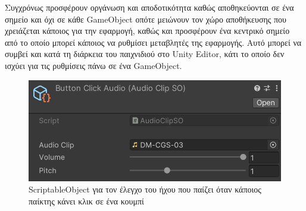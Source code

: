 Συγχρόνως προσφέρουν οργάνωση και αποδοτικότητα καθώς αποθηκεύονται σε ένα σημείο και όχι σε κάθε GameObject οπότε μειώνουν τον χώρο αποθήκευσης που χρειάζεται κάποιος για την εφαρμογή, καθώς και προσφέρουν ένα κεντρικό σημείο από το οποίο μπορεί κάποιος να ρυθμίσει μεταβλητές της εφαρμογής. Αυτό μπορεί να συμβεί και κατά τη διάρκεια του παιχνιδιού στο Unity Editor, κάτι το οποίο δεν ισχύει για τις ρυθμίσεις πάνω σε ένα GameObject.

\begin{figure}[H]
    \centering
    \includegraphics[width=0.6\linewidth]{sections/4/1/images/unity_editor_button_click_audio_so}
    \caption{ScriptableObject για τον έλεγχο του ήχου που παίζει όταν κάποιος παίκτης κάνει κλικ σε ένα κουμπί}
    \label{fig:unity_editor_button_click_audio_so}
\end{figure}
